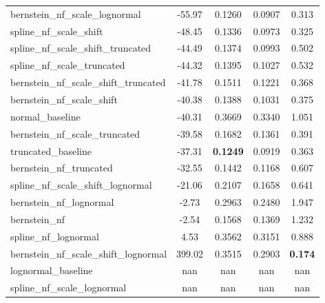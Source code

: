 \begin{table}[t]
\begin{tabular}{lcccc}
  bernstein\_nf\_scale\_lognormal & -55.97 & 0.1260 & 0.0907 & 0.313 \\
  spline\_nf\_scale\_shift & -48.45 & 0.1336 & 0.0973 & 0.325 \\
  spline\_nf\_scale\_shift\_truncated & -44.49 & 0.1374 & 0.0993 & 0.502 \\
  spline\_nf\_scale\_truncated & -44.32 & 0.1395 & 0.1027 & 0.532 \\
  bernstein\_nf\_scale\_shift\_truncated & -41.78 & 0.1511 & 0.1221 & 0.368 \\
  bernstein\_nf\_scale\_shift & -40.38 & 0.1388 & 0.1031 & 0.375 \\
  normal\_baseline & -40.31 & 0.3669 & 0.3340 & 1.051 \\
  bernstein\_nf\_scale\_truncated & -39.58 & 0.1682 & 0.1361 & 0.391 \\
  truncated\_baseline & -37.31 & \textbf{0.1249} & 0.0919 & 0.363 \\
  bernstein\_nf\_truncated & -32.55 & 0.1442 & 0.1168 & 0.607 \\
  spline\_nf\_scale\_shift\_lognormal & -21.06 & 0.2107 & 0.1658 & 0.641 \\
  bernstein\_nf\_lognormal & -2.73 & 0.2963 & 0.2480 & 1.947 \\
  bernstein\_nf & -2.54 & 0.1568 & 0.1369 & 1.232 \\
  spline\_nf\_lognormal & 4.53 & 0.3562 & 0.3151 & 0.888 \\
  bernstein\_nf\_scale\_shift\_lognormal & 399.02 & 0.3515 & 0.2903 & \textbf{0.174} \\
  lognormal\_baseline & nan & nan & nan & nan \\
  spline\_nf\_scale\_lognormal & nan & nan & nan & nan \\
\midrule
\bottomrule
\end{tabular}
\end{table}
